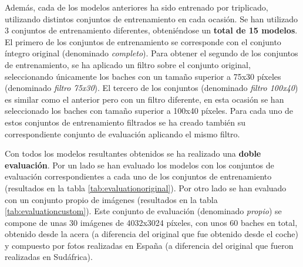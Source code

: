 Además, cada de los modelos anteriores ha sido entrenado por triplicado, utilizando distintos conjuntos de entrenamiento en cada ocasión. Se han utilizado 3 conjuntos de entrenamiento diferentes, obteniéndose un \textbf{total de 15 modelos}. El primero de los conjuntos de entrenamiento se corresponde con el conjunto íntegro original (denominado \textit{completo}). Para obtener el segundo de los conjuntos de entrenamiento, se ha aplicado un filtro sobre el conjunto original, seleccionando únicamente los baches con un tamaño superior a 75x30 píxeles (denominado \textit{filtro 75x30}). El tercero de los conjuntos (denominado \textit{filtro 100x40}) es similar como el anterior pero con un filtro diferente, en esta ocasión se han seleccionado los baches con tamaño superior a 100x40 píxeles. Para cada uno de estos conjuntos de entrenamiento filtrados se ha creado también su correspondiente conjunto de evaluación aplicando el mismo filtro.

Con todos los modelos resultantes obtenidos se ha realizado una \textbf{doble evaluación}. Por un lado se han evaluado los modelos con los conjuntos de evaluación correspondientes a cada uno de los conjuntos de entrenamiento (resultados en la tabla \ref{tab:evaluationoriginal}). Por otro lado se han evaluado con un conjunto propio de imágenes (resultados en la tabla \ref{tab:evaluationcustom}). Este conjunto de evaluación (denominado \textit{propio}) se compone de unas 30 imágenes de 4032x3024 píxeles, con unos 60 baches en total, obtenido desde la acera (a diferencia del original que fue obtenido desde el coche) y compuesto por fotos realizadas en España (a diferencia del original que fueron realizadas en Sudáfrica).

